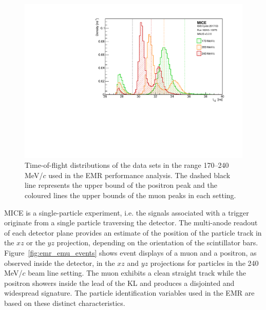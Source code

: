 \begin{figure}[htb!]
	\begin{center}
		\includegraphics[width=0.7\columnwidth]{tof_multi.pdf}  		
		\caption{Time-of-flight distributions of the data sets in the range 170--240\,MeV/$c$ used in the EMR performance analysis. The dashed black line represents the upper bound of the positron peak and the coloured lines the upper bounds of the muon peaks in each setting.}
		\label{fig:emr_analysis_tof}
	\end{center}
\end{figure}

MICE is a single-particle experiment, i.e. the signals associated with a trigger originate from a single particle traversing the detector. The multi-anode readout of each detector plane provides an estimate of the position of the particle track in the $xz$ or the $yz$ projection, depending on the orientation of the scintillator bars. Figure~\ref{fig:emr_emu_events} shows event displays of a muon and a positron, as observed inside the detector, in the $xz$ and $yz$ projections for particles in the 240\,MeV/$c$ beam line setting. The muon exhibits a clean straight track while the positron showers inside the lead of the KL and produces a disjointed and widespread signature. The particle identification variables used in the EMR are based on these distinct characteristics.

